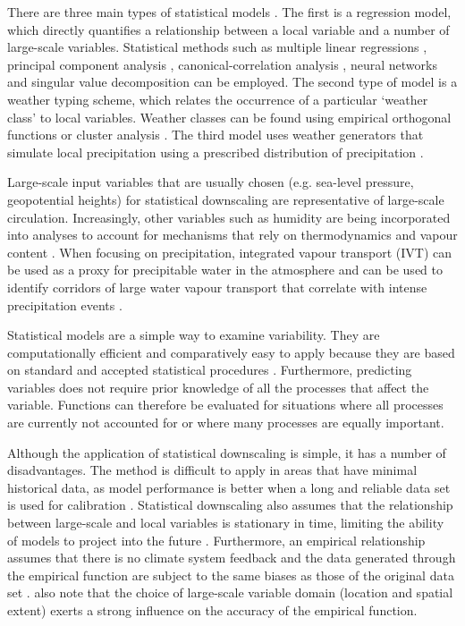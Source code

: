 \documentclass{sfuthesis}
\begin{document}
\begin{appendices}
There are three main types of statistical models \citep{Fowler2007}. The first is a regression model, which directly quantifies a relationship between a local variable and a number of large-scale variables. Statistical methods such as multiple linear regressions \citep{Hanssen-Bauer1998}, principal component analysis \citep{Kidson1998}, canonical-correlation analysis \citep{Busuioc2001}, neural networks \citep{Zorita1999} and singular value decomposition \citep{Widmann2003} can be employed.  The second type of model is a weather typing scheme, which relates the occurrence of a particular `weather class' to local variables. Weather classes can be found using empirical orthogonal functions or cluster analysis \citep{Fowler2007}. The third model uses weather generators that simulate local precipitation using a prescribed distribution of precipitation \citep{Fowler2007}. 

Large-scale input variables that are usually chosen (e.g. sea-level pressure, geopotential heights) for statistical downscaling are representative of large-scale circulation. Increasingly, other variables such as humidity are being incorporated into analyses to account for mechanisms that rely on thermodynamics and vapour content \citep{Fowler2007}. When focusing on precipitation, integrated vapour transport (IVT) can be used as a proxy for precipitable water in the atmosphere and can be used to identify corridors of large water vapour transport that correlate with intense precipitation events \citep{Neiman2008}. 

Statistical models are a simple way to examine variability. They are computationally efficient and comparatively easy to apply because they are based on standard and accepted statistical procedures \citep{Fowler2007}. Furthermore, predicting variables does not require prior knowledge of all the processes that affect the variable. Functions can therefore be evaluated for situations where all processes are currently not accounted for or where many processes are equally important. 

Although the application of statistical downscaling is simple, it has a number of disadvantages. The method is difficult to apply in areas that have minimal historical data, as model performance is better when a long and reliable data set is used for calibration \citep{Fowler2007}. Statistical downscaling also assumes that the relationship between large-scale and local variables is stationary in time, limiting the ability of models to project into the future \citep{Fowler2007}. Furthermore, an empirical relationship assumes that there is no climate system feedback and the data generated through the empirical function are subject to the same biases as those of the original data set \citep{Fowler2007}. \cite{Wilby2000} also note that the choice of large-scale variable domain (location and spatial extent) exerts a strong influence on the accuracy of the empirical function.


\end{appendices}
\end{document}
